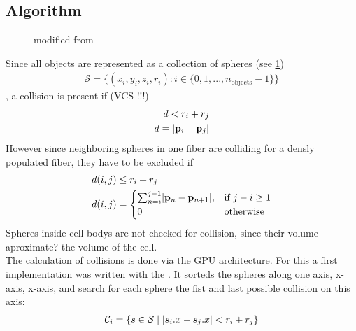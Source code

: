 \subsection{Algorithm}
% 
\begin{figure}[!t]
\centering
\setlength{\tikzwidth}{0.75\textwidth}
\caption{modified from \cite{Ginsburger2019}}
\label{fig:model:medusa_4}
\end{figure}
%
% 
Since all objects are represented as a collection of spheres (see \cref{fig:model:medusa_4})
\begin{align}
    \mathcal{S} = \{ (x_i,y_i,z_i,r_i) : i \in \{0, 1, ..., n_\text{objects}-1\}  \} 
\end{align}
% 
, a collision is present if (VCS !!!)
% 
\begin{align}
\begin{split}
d<r_i+r_j\\
d = \lvert\mathbf{p}_i - \mathbf{p}_j\rvert
\end{split}
\end{align}
% 
However since neighboring spheres in one fiber are colliding for a densly populated fiber, they have to be excluded if
\begin{align}
\begin{split}
d(i,j) &\leq  r_i + r_j\\
d(i,j) &= 
\begin{cases}
\sum_{n=i}^{j-1} \lvert\mathbf{p}_n - \mathbf{p}_{n+1}\rvert,& \text{if } j-i \geq 1\\
0 & \text{otherwise}
\end{cases}
\end{split}
\end{align}
% 
Spheres inside cell bodys are not checked for collision, since their volume aproximate? the volume of the cell.\\
% 
The calculation of collisions is done via the GPU architecture. For this a first implementation was written with the  \cite{Karras2012}. It sorteds the spheres along one axis, \eg{} x-axis, x-axis, and search for each sphere the fist and last possible collision on this axis:
\begin{align}
\begin{split}
\mathcal{C}_i = \{ s \in \mathcal{S} \mid \lvert s_i.x - s_j.x\rvert < r_i+r_j \}
\end{split}
\end{align}
